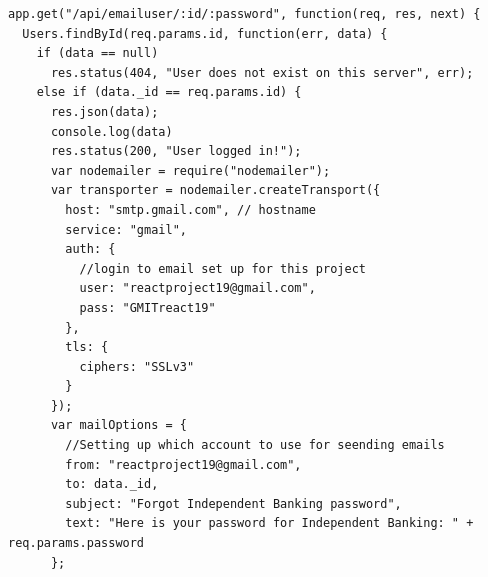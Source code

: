 \begin{verbatim}
app.get("/api/emailuser/:id/:password", function(req, res, next) {
  Users.findById(req.params.id, function(err, data) {
    if (data == null)
      res.status(404, "User does not exist on this server", err);
    else if (data._id == req.params.id) {
      res.json(data);
      console.log(data)
      res.status(200, "User logged in!");
      var nodemailer = require("nodemailer");
      var transporter = nodemailer.createTransport({
        host: "smtp.gmail.com", // hostname
        service: "gmail",
        auth: {
          //login to email set up for this project
          user: "reactproject19@gmail.com",
          pass: "GMITreact19"
        },
        tls: {
          ciphers: "SSLv3"
        }
      });
      var mailOptions = {
        //Setting up which account to use for seending emails
        from: "reactproject19@gmail.com",
        to: data._id,
        subject: "Forgot Independent Banking password",
        text: "Here is your password for Independent Banking: " + req.params.password
      };


\end{verbatim}
